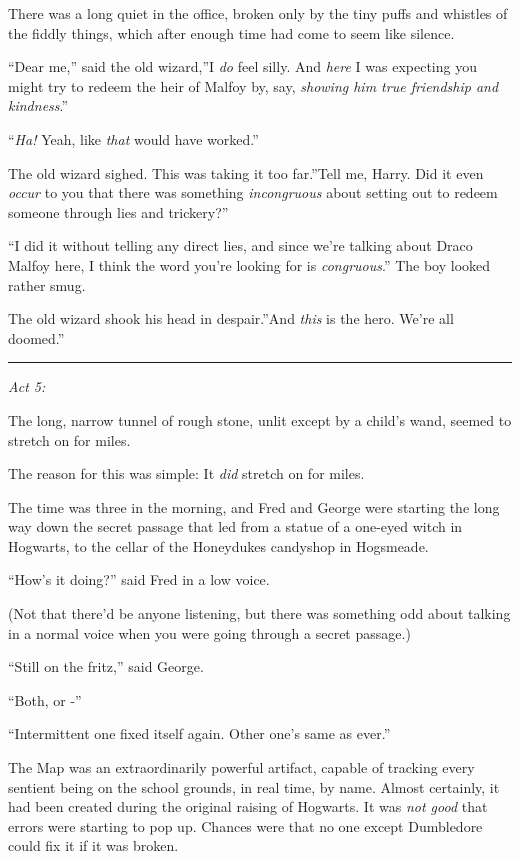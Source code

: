 There was a long quiet in the office, broken only by the tiny puffs and
whistles of the fiddly things, which after enough time had come to seem
like silence.

``Dear me,'' said the old wizard,''I \emph{do} feel silly. And
\emph{here} I was expecting you might try to redeem the heir of Malfoy
by, say, \emph{showing him true friendship and kindness}.''

``\emph{Ha!} Yeah, like \emph{that} would have worked.''

The old wizard sighed. This was taking it too far.''Tell me, Harry. Did
it even \emph{occur} to you that there was something \emph{incongruous}
about setting out to redeem someone through lies and trickery?''

``I did it without telling any direct lies, and since we're talking about
Draco Malfoy here, I think the word you're looking for is
\emph{congruous}.'' The boy looked rather smug.

The old wizard shook his head in despair.''And \emph{this} is the hero.
We're all doomed.''

\begin{center}\rule{3in}{0.4pt}\end{center}

\emph{Act 5:}

The long, narrow tunnel of rough stone, unlit except by a child's wand,
seemed to stretch on for miles.

The reason for this was simple: It \emph{did} stretch on for miles.

The time was three in the morning, and Fred and George were starting the
long way down the secret passage that led from a statue of a one-eyed
witch in Hogwarts, to the cellar of the Honeydukes candyshop in
Hogsmeade.

``How's it doing?'' said Fred in a low voice.

(Not that there'd be anyone listening, but there was something odd about
talking in a normal voice when you were going through a secret passage.)

``Still on the fritz,'' said George.

``Both, or -''

``Intermittent one fixed itself again. Other one's same as ever.''

The Map was an extraordinarily powerful artifact, capable of tracking
every sentient being on the school grounds, in real time, by name.
Almost certainly, it had been created during the original raising of
Hogwarts. It was \emph{not good} that errors were starting to pop up.
Chances were that no one except Dumbledore could fix it if it was
broken.

